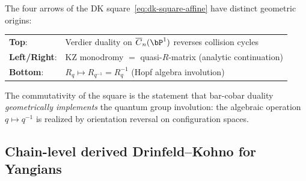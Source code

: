 \begin{remark}\label{rem:dk-square-geometry}
The four arrows of the DK square~\eqref{eq:dk-square-affine} have
distinct geometric origins:
\begin{center}
\renewcommand{\arraystretch}{1.2}
\begin{tabular}{ll}
\textbf{Top}: & Verdier duality on $\overline{C}_n(\bP^1)$
  reverses collision cycles \\
\textbf{Left/Right}: & KZ monodromy $=$ quasi-$R$-matrix
  (analytic continuation) \\
\textbf{Bottom}: & $R_q \mapsto R_{q^{-1}} = R_q^{-1}$
  (Hopf algebra involution)
\end{tabular}
\end{center}
The commutativity of the square is the statement that
bar-cobar duality \emph{geometrically implements} the quantum
group involution: the algebraic operation $q \mapsto q^{-1}$
is realized by orientation reversal on configuration spaces.
\end{remark}

\subsection{Chain-level derived Drinfeld--Kohno for Yangians}

